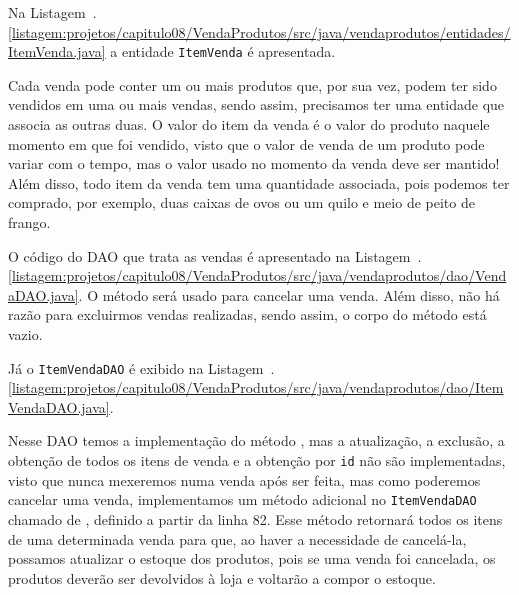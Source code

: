 
Na Listagem~\thechapter.\ref{listagem:projetos/capitulo08/VendaProdutos/src/java/vendaprodutos/entidades/ItemVenda.java} a entidade \texttt{ItemVenda} é apresentada. 


Cada venda pode conter um ou mais produtos que, por sua vez, podem ter sido vendidos em uma ou mais vendas, sendo assim, precisamos ter uma entidade que associa as outras duas. O valor do item da venda é o valor do produto naquele momento em que foi vendido, visto que o valor de venda de um produto pode variar com o tempo, mas o valor usado no momento da venda deve ser mantido! Além disso, todo item da venda tem uma quantidade associada, pois podemos ter comprado, por exemplo, duas caixas de ovos ou um quilo e meio de peito de frango.

O código do DAO que trata as vendas é apresentado na Listagem~\thechapter.\ref{listagem:projetos/capitulo08/VendaProdutos/src/java/vendaprodutos/dao/VendaDAO.java}. O método  será usado para cancelar uma venda. Além disso, não há razão para excluirmos vendas realizadas, sendo assim, o corpo do método está vazio.


Já o \texttt{ItemVendaDAO} é exibido na Listagem~\thechapter.\ref{listagem:projetos/capitulo08/VendaProdutos/src/java/vendaprodutos/dao/ItemVendaDAO.java}.


Nesse DAO temos a implementação do método , mas a atualização, a exclusão, a obtenção de todos os itens de venda e a obtenção por \texttt{id} não são implementadas, visto que nunca mexeremos numa venda após ser feita, mas como poderemos cancelar uma venda, implementamos um método adicional no \texttt{ItemVendaDAO} chamado de , definido a partir da linha 82. Esse método retornará todos os itens de uma determinada venda para que, ao haver a necessidade de cancelá-la, possamos atualizar o estoque dos produtos, pois se uma venda foi cancelada, os produtos deverão ser devolvidos à loja e voltarão a compor o estoque.

